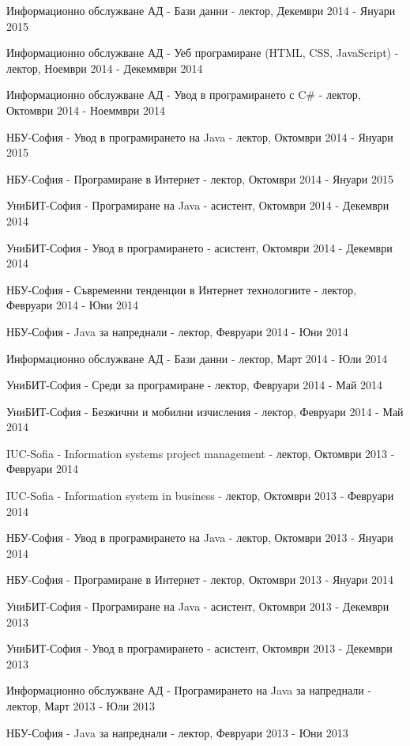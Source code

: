 \documentclass[bulgarian,a4paper]{europasscv}
\begin{document}
\begin{europasscv}
{\begin{ecvitemize}
    \item Информационно обслужване АД - Бази данни - лектор, Декември 2014 - Януари 2015
    \item Информационно обслужване АД - Уеб програмиране (HTML, CSS, JavaScript) - лектор, Ноември 2014 - Декеммври 2014
    \item Информационно обслужване АД - Увод в програмирането с C\# - лектор, Октомври 2014 - Ноеммври 2014
    \item НБУ-София - Увод в програмирането на Java - лектор, Октомври 2014 - Януари 2015
    \item НБУ-София - Програмиране в Интернет - лектор, Октомври 2014 - Януари 2015
    \item УниБИТ-София - Програмиране на Java - асистент, Октомври 2014 - Декември 2014
    \item УниБИТ-София - Увод в програмирането - асистент, Октомври 2014 - Декември 2014
    \item НБУ-София - Съвременни тенденции в Интернет технологиите - лектор, Февруари 2014 - Юни 2014
    \item НБУ-София - Java за напреднали - лектор, Февруари 2014 - Юни 2014
    \item Информационно обслужване АД - Бази данни - лектор, Март 2014 - Юли 2014
    \item УниБИТ-София - Среди за програмиране - лектор, Февруари 2014 - Май 2014
    \item УниБИТ-София - Безжични и мобилни изчисления - лектор, Февруари 2014 - Май 2014
    \item IUC-Sofia - Information systems project management - лектор, Октомври 2013 - Февруари 2014
    \item IUC-Sofia - Information system in business - лектор, Октомври 2013 - Февруари 2014
    \item НБУ-София - Увод в програмирането на Java - лектор, Октомври 2013 - Януари 2014
    \item НБУ-София - Програмиране в Интернет - лектор, Октомври 2013 - Януари 2014
    \item УниБИТ-София - Програмиране на Java - асистент, Октомври 2013 - Декември 2013
    \item УниБИТ-София - Увод в програмирането - асистент, Октомври 2013 - Декември 2013
    \item Информационно обслужване АД - Програмирането на Java за напреднали - лектор, Март 2013 - Юли 2013
    \item НБУ-София - Java за напреднали - лектор, Февруари 2013 - Юни 2013

\end{ecvitemize}}
\end{europasscv}
\end{document}
